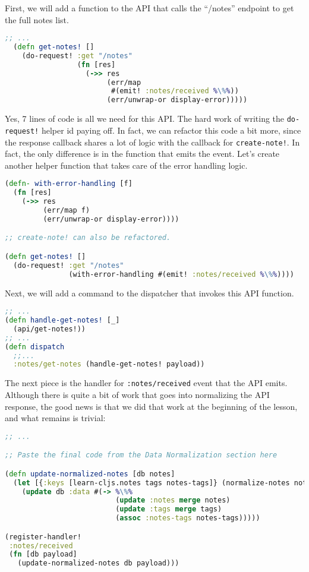 \documentclass[10pt,twoside,openright]{memoir}
\begin{document}
First, we will add a function to the API that calls the ``/notes''
endpoint to get the full notes list.

\begin{lstlisting}[language=Clojure, caption={notes/api.cljs}]
  ;; ...
  (defn get-notes! []
    (do-request! :get "/notes"
                 (fn [res]
                   (->> res
                        (err/map
                         #(emit! :notes/received %\%%))
                        (err/unwrap-or display-error)))))
\end{lstlisting}

Yes, 7 lines of code is all we need for this API. The hard work of
writing the \texttt{do-request!} helper id paying off. In fact, we can
refactor this code a bit more, since the response callback shares a lot
of logic with the callback for \texttt{create-note!}. In fact, the only
difference is in the function that emits the event. Let's create another
helper function that takes care of the error handling logic.

\begin{lstlisting}[language=Clojure]
(defn- with-error-handling [f]
  (fn [res]
    (->> res
         (err/map f)
         (err/unwrap-or display-error))))

;; create-note! can also be refactored.

(defn get-notes! []
  (do-request! :get "/notes"
               (with-error-handling #(emit! :notes/received %\%%))))
\end{lstlisting}

Next, we will add a command to the dispatcher that invokes this API
function.

\begin{lstlisting}[language=Clojure, caption={notes/command.cljs}]
;; ...
(defn handle-get-notes! [_]
  (api/get-notes!))
;; ...
(defn dispatch
  ;;...
  :notes/get-notes (handle-get-notes! payload))
\end{lstlisting}

The next piece is the handler for \texttt{:notes/received} event that
the API emits. Although there is quite a bit of work that goes into
normalizing the API response, the good news is that we did that work at
the beginning of the lesson, and what remains is trivial:

\begin{lstlisting}[language=Clojure, caption={notes/event\_handlers/api\_data.cljs}]
;; ...

;; Paste the final code from the Data Normalization section here

(defn update-normalized-notes [db notes]
  (let [{:keys [learn-cljs.notes tags notes-tags]} (normalize-notes notes)]
    (update db :data #(-> %\%%
                          (update :notes merge notes)
                          (update :tags merge tags)
                          (assoc :notes-tags notes-tags)))))

(register-handler!
 :notes/received
 (fn [db payload]
   (update-normalized-notes db payload)))
\end{lstlisting}
\end{document}
